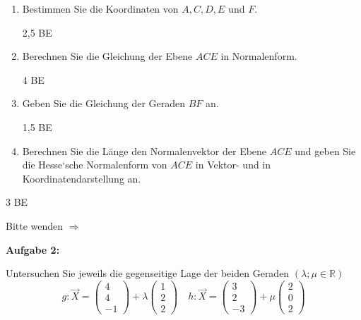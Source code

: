 \documentclass[a4paper,12pt]{article}
\newcommand{\Aufgabe}[1]{
  {
  \vspace*{0.5cm}
  \textsf{\textbf{Aufgabe #1}}
  \vspace*{0.2cm}
  
  }
}
\begin{document}
\begin{enumerate}[label={\alph*)}]
\item Bestimmen Sie die Koordinaten von $A, C, D, E$ und $F$.
\begin{flushright}2,5 BE \end{flushright}
\item Berechnen Sie die Gleichung der Ebene $ACE$ in Normalenform.
\begin{flushright}4 BE \end{flushright}
\item Geben Sie die Gleichung der Geraden $BF$ an.
\begin{flushright}1,5 BE \end{flushright}
\item Berechnen Sie die Länge den Normalenvektor der Ebene $ACE$ und geben Sie die Hesse`sche Normalenform von $ACE$ in Vektor- und in Koordinatendarstellung an.
\end{enumerate}
\begin{flushright}3 BE \end{flushright}

  \vspace{1cm}
\begin{flushright}Bitte wenden $\Rightarrow$ \end{flushright}

\newpage
\Aufgabe{2:}
Untersuchen Sie jeweils die gegenseitige Lage der beiden Geraden $(\lambda;\mu \in \mathbb{R})$
\[
          g: \vec{X} = \begin{pmatrix}4 \\ 4 \\-1 \end{pmatrix} 
                     + \lambda \begin{pmatrix}1 \\ 2 \\2 \end{pmatrix}
            \quad
          h: \vec{X} = \begin{pmatrix}3 \\ 2 \\-3 \end{pmatrix}
                     + \mu \begin{pmatrix}2 \\ 0 \\2 \end{pmatrix}
\]
\end{document}
